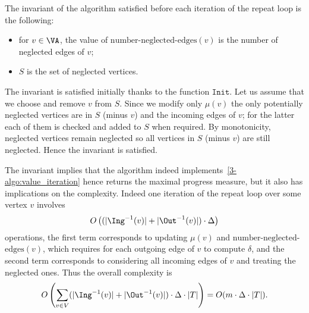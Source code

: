 The invariant of the algorithm satisfied before each iteration of the repeat loop is the following:
\begin{itemize}
	\item for $v \in \VA$, the value of $\text{number}$-$\text{neglected}$-$\text{edges}(v)$
	is the number of neglected edges of $v$;
	\item $S$ is the set of neglected vertices.
\end{itemize}
The invariant is satisfied initially thanks to the function $\texttt{Init}$.
Let us assume that we choose and remove $v$ from $S$.
Since we modify only $\mu(v)$ the only potentially neglected vertices are in $S$ (minus $v$) and the incoming edges of $v$;
for the latter each of them is checked and added to $S$ when required.
By monotonicity, neglected vertices remain neglected so all vertices in $S$ (minus $v$) are still neglected.
Hence the invariant is satisfied.

The invariant implies that the algorithm indeed implements~\cref{3-algo:value_iteration} hence returns the maximal progress measure, 
but it also has implications on the complexity.
Indeed one iteration of the repeat loop over some vertex $v$ involves 
\[
O\left( (|\Ing^{-1}(v)| + |\Out^{-1}(v)|) \cdot \Delta \right)
\]
operations,
the first term corresponds to updating $\mu(v)$ and $\text{number}$-$\text{neglected}$-$\text{edges}(v)$,
which requires for each outgoing edge of $v$ to compute $\delta$,
and the second term corresponds to considering all incoming edges of $v$ and treating the neglected ones.
Thus the overall complexity is
\[
O\left( 
\sum_{v \in V} (|\Ing^{-1}(v)| + |\Out^{-1}(v)|) \cdot \Delta \cdot |T|
\right) 
= O(m \cdot \Delta \cdot |T|).
\]

